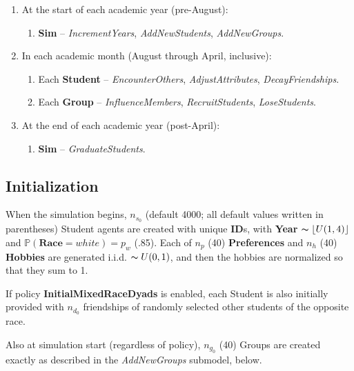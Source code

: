 \begin{enumerate}
\itemsep.1em
\item At the start of each academic year (pre-August):

    \begin{enumerate}
    \itemsep.1em
    \item \textbf{Sim} -- \textsl{IncrementYears}, \textsl{AddNewStudents},
\textsl{AddNewGroups}.
    \end{enumerate}

\item In each academic month (August through April, inclusive):

    \begin{enumerate}
    \itemsep.1em
    \item Each \textbf{Student} -- \textsl{EncounterOthers},
\textsl{AdjustAttributes}, \textsl{DecayFriendships}. 
    \item Each \textbf{Group} -- \textsl{InfluenceMembers},
\textsl{RecruitStudents}, \textsl{LoseStudents}.
    \end{enumerate}

\item At the end of each academic year (post-April):

    \begin{enumerate}
    \itemsep.1em
    \item \textbf{Sim} -- \textsl{GraduateStudents}. %
    \end{enumerate}
\end{enumerate}

\subsection{Initialization}

When the simulation begins, $n_{s_0}$ (default 4000; all default values
written in parentheses) Student agents are created with unique \textbf{ID}s,
with \textbf{Year} $\thicksim \left \lfloor U(1,4) \right \rfloor$ and
$\mathbb{P}(\textbf{Race}=white) = p_w$ (.85). Each of $n_p$ (40)
\textbf{Preferences} and $n_h$ (40) \textbf{Hobbies} are generated i.i.d.
$\thicksim U(0,1)$, and then the hobbies are normalized so that they sum to 1.

If policy \textbf{InitialMixedRaceDyads} is enabled, each Student is also
initially provided with $n_{d_0}$ friendships of randomly selected other
students of the opposite race.

Also at simulation start (regardless of policy), $n_{g_0}$ (40) Groups are
created exactly as described in the \textsl{AddNewGroups} submodel, below.

